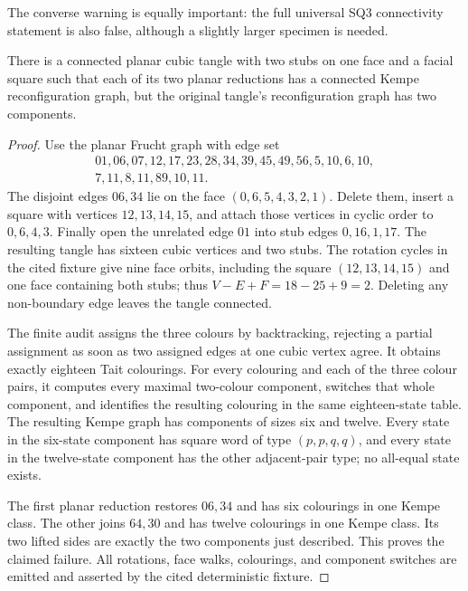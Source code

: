 The converse warning is equally important: the full universal SQ3
connectivity statement is also false, although a slightly larger specimen is
needed.

\begin{proposition}
\label{prop:universal-sq3-refuted}
There is a connected planar cubic tangle with two stubs on one face and a
facial square such that each of its two planar reductions has a connected
Kempe reconfiguration graph, but the original tangle's reconfiguration graph
has two components.
\end{proposition}

\begin{proof}
Use the planar Frucht graph with edge set
\[
\begin{gathered}
01,06,07,12,17,23,28,34,39,45,49,56,5,10,6,10,\\
7,11,8,11,89,10,11.
\end{gathered}
\]
The disjoint edges \(06,34\) lie on the face
\((0,6,5,4,3,2,1)\).  Delete them, insert a square with vertices
\(12,13,14,15\), and attach those vertices in cyclic order to
\(0,6,4,3\).  Finally open the unrelated edge \(01\) into stub edges
\(0,16,1,17\).  The resulting tangle has sixteen cubic vertices and two
stubs.  The rotation cycles in the cited fixture give nine face orbits,
including the square \((12,13,14,15)\) and one face containing both stubs;
thus \(V-E+F=18-25+9=2\).  Deleting any non-boundary edge leaves the tangle
connected.

The finite audit assigns the three colours by backtracking, rejecting a
partial assignment as soon as two assigned edges at one cubic vertex agree.
It obtains exactly eighteen Tait colourings.  For every colouring and each
of the three colour pairs, it computes every maximal two-colour component,
switches that whole component, and identifies the resulting colouring in the
same eighteen-state table.  The resulting Kempe graph has components of
sizes six and twelve.  Every state in the six-state component has square word
of type \((p,p,q,q)\), and every state in the twelve-state component has the
other adjacent-pair type; no all-equal state exists.

The first planar reduction restores \(06,34\) and has six colourings in one
Kempe class.  The other joins \(64,30\) and has twelve colourings in one
Kempe class.  Its two lifted sides are exactly the two components just
described.  This proves the claimed failure.  All rotations, face walks,
colourings, and component switches are emitted and asserted by the cited
deterministic fixture.
\end{proof}

